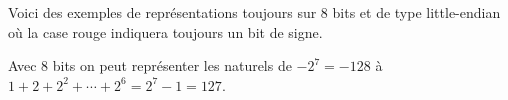 Voici des exemples de représentations toujours sur 8 bits et de type little-endian où la case rouge indiquera toujours un bit de signe.

\medskip


\medskip


\medskip


\medskip

Avec 8 bits on peut représenter les naturels de $-2^7 = -128$ à $1 + 2 + 2^2 + \cdots + 2^6 = 2^7 - 1 = 127$.

\medskip

